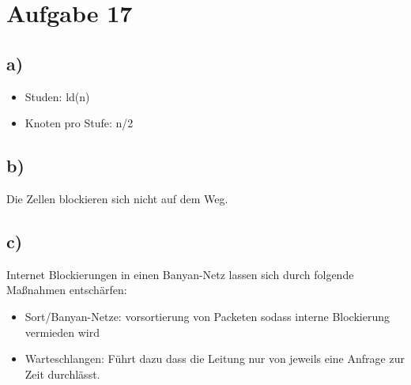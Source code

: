 \documentclass[a4paper,12pt]{scrartcl}
\begin{document}
\section{Aufgabe 17}
\subsection{a)}
\begin{itemize}
	\item Studen: ld(n)
	\item Knoten pro Stufe: n/2
\end{itemize}
\subsection{b)}
\begin{center}
\end{center}
Die Zellen blockieren sich nicht auf dem Weg.
\subsection{c)}
Internet Blockierungen in einen Banyan-Netz lassen sich durch folgende Maßnahmen entschärfen:
\begin{itemize}
	\item Sort/Banyan-Netze: vorsortierung von Packeten sodass interne Blockierung vermieden wird
	\item Warteschlangen: Führt dazu dass die Leitung nur von jeweils eine Anfrage zur Zeit durchlässt.
\end{itemize}
\end{document}

